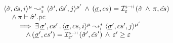 \begin{lemma}\label{lemma:full:soundiness}
$$
\begin{array}{l} 
\transabssemrule{\sstate, \scs, i}{\sstate', \scs', j}{\mode}{\mode'}{\symbolic} \, \wedge \, 
     (\istate, \cs) = \interpret{\symbinst}{\senv}(\sstate \, \wedge \, \pc, \scs)  \\ \quad \, \wedge \, 
     \pc \vdash \sstate'.\pcsel \\ \quad \quad
     \implies 
        \exists \, \istate', \cs' \, . \, \transabssemrule{\istate, \cs, i}{\istate', \cs', j}{\mode}{\mode'}{\instrumented} \\ \quad \quad \quad
         \, \wedge \, 
            (\istate', \cs') = \interpret{\symbinst}{\senv'}(\sstate', \scs')  \, \wedge \, 
            \senv' \fextends  \senv
 \end{array}
$$
\end{lemma}
